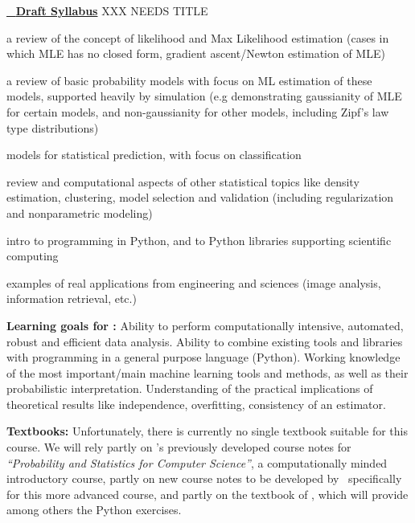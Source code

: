 \vskip 0.2in
\bit
\item  \underline{\statcl~ {\bf Draft Syllabus}}  XXX NEEDS TITLE \\
\bit
\item a review of the concept of likelihood and Max Likelihood estimation (cases in which MLE has no closed form, gradient ascent/Newton estimation of MLE)
\item a review of basic probability models with focus on ML estimation of these models, supported heavily by simulation (e.g demonstrating gaussianity of MLE for certain models, and non-gaussianity for other models, including Zipf's law type distributions)
\item models for statistical prediction, with focus on classification
\item review and computational aspects of other statistical topics like
  density estimation, clustering, model selection and validation
  (including regularization and  nonparametric modeling)
\item intro to programming in Python, and to Python libraries supporting scientific computing
\item examples of real applications from engineering and sciences (image analysis, information retrieval, etc.)
\eit
\item[]{\bf Learning goals for \statcl:} Ability to perform computationally intensive, automated, robust and efficient data analysis. Ability to combine existing tools and libraries with programming in a general purpose language (Python). 
Working knowledge of the most important/main machine learning tools and methods, as well as their probabilistic interpretation. Understanding of the practical implications of theoretical results like independence, overfitting, consistency of an estimator. 

{\bf Textbooks:} Unfortunately, there is currently no single textbook
suitable for this course. We will rely partly on \meila's previously
developed course notes for {\it ``Probability and Statistics for
  Computer Science''}, a computationally minded introductory course,
partly on new course notes to be developed by \meila\ specifically for
this more advanced course, and partly on the textbook of \astrocl,
which will provide among others the Python exercises. %

